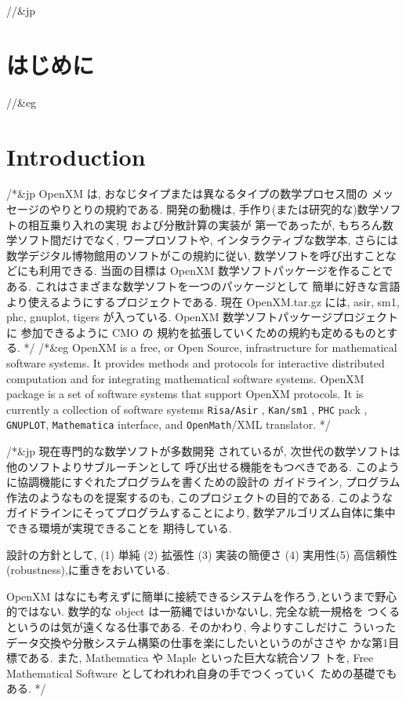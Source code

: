 //&jp \section{はじめに}
//&eg \section{Introduction}

/*&jp
OpenXM は, おなじタイプまたは異なるタイプの数学プロセス間の
メッセージのやりとりの規約である.
開発の動機は, 手作り(または研究的な)数学ソフトの相互乗り入れの実現
および分散計算の実装が
第一であったが, もちろん数学ソフト間だけでなく, ワープロソフトや,
インタラクティブな数学本,
さらには数学デジタル博物館用のソフトがこの規約に従い, 
数学ソフトを呼び出すことなどにも利用できる.
当面の目標は OpenXM 数学ソフトパッケージを作ることである.
これはさまざまな数学ソフトを一つのパッケージとして
簡単に好きな言語より使えるようにするプロジェクトである.
現在 OpenXM.tar.gz には,
asir, sm1, phc, gnuplot, tigers が入っている.
OpenXM 数学ソフトパッケージプロジェクトに
参加できるように CMO の
規約を拡張していくための規約も定めるものとする.
*/
/*&eg
OpenXM is a free, or Open Source, infrastructure for mathematical
software systems.
It provides methods and protocols
for interactive distributed computation and
for integrating mathematical software systems.
OpenXM package is a set of software systems that support OpenXM protocols.
It is currently a collection of software systems
{\tt Risa/Asir} \cite{asir}, {\tt Kan/sm1} \cite{kan}, {\tt PHC} pack \cite{phc}
, {\tt GNUPLOT},
{\tt Mathematica} interface, and
{\tt OpenMath}/XML \cite{openmath} translator.
*/

/*&jp
現在専門的な数学ソフトが多数開発
されているが, 次世代の数学ソフトは他のソフトよりサブルーチンとして
呼び出せる機能をもつべきである.
このように協調機能にすぐれたプログラムを書くための設計の
ガイドライン, プログラム作法のようなものを提案するのも, 
このプロジェクトの目的である.
このようなガイドラインにそってプログラムすることにより,
数学アルゴリズム自体に集中できる環境が実現できることを
期待している.

設計の方針として, (1) 単純 (2) 拡張性 (3) 実装の簡便さ (4) 実用性(5) 
高信頼性(robustness),に重きをおいている.  

OpenXM はなにも考えずに簡単に接続できるシステムを作ろう,というまで野心
的ではない.  数学的な object は一筋縄ではいかないし, 完全な統一規格を
つくるというのは気が遠くなる仕事である. そのかわり, 今よりすこしだけこ
ういったデータ交換や分散システム構築の仕事を楽にしたいというのがささや
かな第1目標である.  また, Mathematica や Maple といった巨大な統合ソフ
トを, Free Mathematical Software としてわれわれ自身の手でつくっていく
ための基礎でもある.
*/

